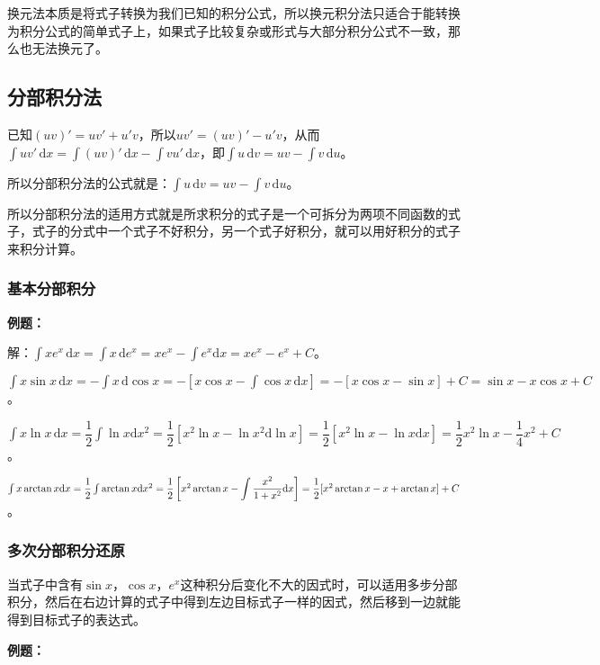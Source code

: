 \documentclass[UTF8, 12pt]{ctexart}
\begin{document}
        换元法本质是将式子转换为我们已知的积分公式，所以换元积分法只适合于能转换为积分公式的简单式子上，如果式子比较复杂或形式与大部分积分公式不一致，那么也无法换元了。

        \subsection{分部积分法}

        已知$(uv)'=uv'+u'v$，所以$uv'=(uv)'-u'v$，从而$\int uv'\,\textrm{d}x=\int(uv)'\,\textrm{d}x-\int vu'\,\textrm{d}x$，即$\int u\,\textrm{d}v=uv-\int v\,\textrm{d}u$。

        所以分部积分法的公式就是：$\int u\,\textrm{d}v=uv-\int v\,\textrm{d}u$。

        所以分部积分法的适用方式就是所求积分的式子是一个可拆分为两项不同函数的式子，式子的分式中一个式子不好积分，另一个式子好积分，就可以用好积分的式子来积分计算。

        \subsubsection{基本分部积分}

        \textbf{例题：}

        解：$\int xe^x\,\textrm{d}x=\int x\,\textrm{d}e^x=xe^x-\int e^x\textrm{d}x=xe^x-e^x+C$。

        $\int x\sin x\,\textrm{d}x=-\int x\,\textrm{d}\cos x=-[x\cos x-\int\cos x\,\textrm{d}x]=-[x\cos x-\sin x]+C=\sin x-x\cos x+C$。

        $\int x\ln x\,\textrm{d}x=\dfrac{1}{2}\int\ln x\textrm{d}x^2=\dfrac{1}{2}[x^2\ln x-\ln x^2\textrm{d}\ln x]=\dfrac{1}{2}[x^2\ln x-\ln x\textrm{d}x]=\dfrac{1}{2}x^2\ln x-\dfrac{1}{4}x^2+C$。

        $\int x\arctan x\textrm{d}x=\dfrac{1}{2}\int\arctan x\textrm{d}x^2=\dfrac{1}{2}\left[x^2\arctan x-\displaystyle{\int\dfrac{x^2}{1+x^2}\textrm{d}x}\right]=\\ \dfrac{1}{2}[x^2\arctan x-x+\arctan x]+C$。

        \subsubsection{多次分部积分还原}

        当式子中含有$\sin x$，$\cos x$，$e^x$这种积分后变化不大的因式时，可以适用多步分部积分，然后在右边计算的式子中得到左边目标式子一样的因式，然后移到一边就能得到目标式子的表达式。

        \textbf{例题：}\medskip
\end{document}
